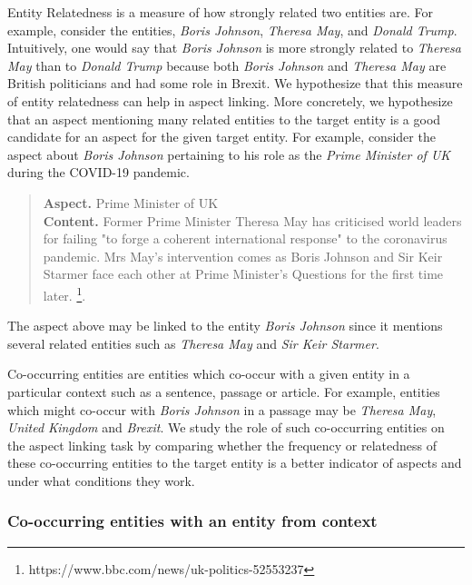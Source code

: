 Entity Relatedness is a measure of how strongly related two entities are. For example, consider the entities, \textit{Boris Johnson}, \textit{Theresa May}, and \textit{Donald Trump}. Intuitively, one would say that \textit{Boris Johnson} is more strongly related to \textit{Theresa May} than to \textit{Donald Trump} because both \textit{Boris Johnson} and \textit{Theresa May} are British politicians and had some role in Brexit. We hypothesize that this measure of entity relatedness can help in aspect linking. More concretely, we hypothesize that an aspect mentioning many related entities to the target entity  is a good candidate for an aspect for the given target entity. For example, consider the aspect about \textit{Boris Johnson} pertaining to his role as the \textit{Prime Minister of UK} during the COVID-19 pandemic.

\begin{quote}
    \textbf{Aspect.} Prime Minister of UK \\
    \textbf{Content.}
    Former Prime Minister Theresa May has criticised world leaders for failing "to forge a coherent international response" to the coronavirus pandemic. Mrs May's intervention comes as Boris Johnson and Sir Keir Starmer face each other at Prime Minister's Questions for the first time later. \footnote{https://www.bbc.com/news/uk-politics-52553237}.
\end{quote}
The aspect above may be linked to the entity \textit{Boris Johnson} since it mentions several related entities such as \textit{Theresa May} and \textit{Sir Keir Starmer}. 


Co-occurring entities are entities which co-occur with a given entity in a particular context such as a sentence, passage or article. For example, entities which might co-occur with \textit{Boris Johnson} in a passage may be \textit{Theresa May}, \textit{United Kingdom} and \textit{Brexit}. We study the role of such co-occurring entities on the aspect linking task by comparing whether the frequency or relatedness of these co-occurring entities to the target entity is a better indicator of aspects and under what conditions they work. 


\subsubsection{Co-occurring entities with an entity from context}
\label{subsubsec:Co-occurring entities with an entity from context}


